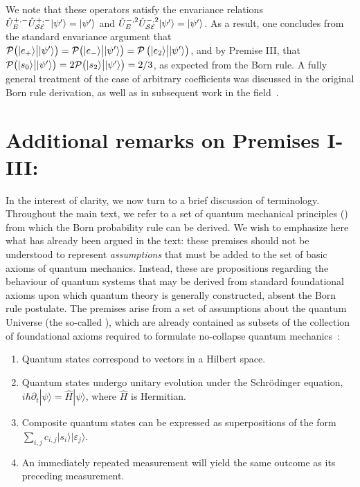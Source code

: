 \documentclass[12pt]{iopart}
\begin{document}
%
We note that these operators satisfy the envariance relations $\hat{U}^{+,-}_{E}\hat{U}^{+,-}_{\cal SE}|\psi'\rangle=|\psi'\rangle$ and $\hat{U}^{-,2}_{E}\hat{U}^{-,2}_{\cal SE}|\psi'\rangle=|\psi'\rangle$. As a result, one concludes from the standard envariance argument that ${\cal P}\big(|e_+\rangle \big{|} |\psi'\rangle\big)={\cal P}\big(|e_-\rangle \big{|} |\psi'\rangle\big)={\cal P}\left(|e_2\rangle \big{|} |\psi'\rangle\right)$, and by Premise III, that ${\cal P}\big(|s_0\rangle \big{|} |\psi'\rangle\big)=2 {\cal P}\big(|s_2\rangle \big{|} |\psi'\rangle\big)=2/3$, as expected from the Born rule. A fully general treatment of the case of arbitrary coefficients was discussed in the original Born rule derivation, as well as in subsequent work in the field~\cite{zurek:03a,zurek:11}. 

\section{Additional remarks on Premises I-III:}
In the interest of clarity, we now turn to a brief discussion of terminology. Throughout the main text, we refer to a set of quantum mechanical principles () from which the Born probability rule can be derived. We wish to emphasize here what has already been argued in the text: these premises should not be understood to represent \textit{assumptions} that must be added to the set of basic  axioms of quantum mechanics. Instead, these are propositions regarding the behaviour of quantum systems that may be derived from standard foundational axioms upon which quantum theory is generally constructed, absent the Born rule postulate. The premises arise from a set of assumptions about the quantum Universe (the so-called ), which are already contained as subsets of the collection of foundational axioms required to formulate no-collapse quantum mechanics~\cite{zurek:14,zurek:05}:

\begin{enumerate}
\item Quantum states correspond to vectors in a Hilbert space. 
\item Quantum states undergo unitary evolution under the Schr\"odinger equation, $i\hbar\partial_t|\psi\rangle=\hat{H}|\psi\rangle$, where $\hat{H}$ is Hermitian.
\item Composite quantum states can be expressed as superpositions of the form $\sum_{i,j}c_{i,j}|s_i\rangle|\varepsilon_j\rangle$.
\item An immediately repeated measurement will yield the same outcome as its preceding measurement.
\end{enumerate}
\end{document}
